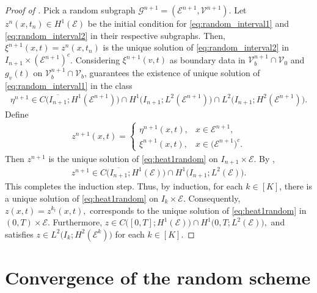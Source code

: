 \documentclass[a4paper, 10pt, english]{article}
\begin{document}
\begin{proof}[Proof of ]
Pick a random subgraph $\mathcal{G}^{n+1} = (\mathcal{E}^{n+1}, \mathcal{V}^{n+1})$. Let $z^n(x,t_n) \in H^1(\mathcal{E})$ be the initial condition for \eqref{eq:random_interval1} and \eqref{eq:random_interval2} in their respective subgraphs. Then, $ \xi^{n+1}(x,t) = z^n(x,t_n)$ is the unique solution of \eqref{eq:random_interval2} in $I_{n+1} \times (\mathcal{E}^{n+1})^c$. Considering $\xi^{n+1}(v,t)$ as boundary data in $ \mathcal{V}_b^{n+1} \cap \mathcal{V}_0$ and $g_v(t)$ on $\mathcal{V}_b^{n+1} \cap \mathcal{V}_b$,  guarantees the existence of unique solution of \eqref{eq:random_interval1} in the class
\begin{align*}
  \eta^{n+1} 
  \in 
  C\bigl(\overline{I_{n+1}}; H^1(\mathcal{E}^{n+1})\bigr)
  \cap
  H^1\bigl(I_{n+1}; L^2(\mathcal{E}^{n+1})\bigr)
  \cap
  L^2\bigl(I_{n+1}; H^2(\mathcal{E}^{n+1})\bigr).
\end{align*}
Define
\begin{align*}
  z^{n+1}(x,t)
  =
  \begin{cases}
    \eta^{n+1}(x,t), & x \in \mathcal{E}^{n+1}, \\
    \xi^{n+1}(x,t),    & x \in \bigl(\mathcal{E}^{n+1}\bigr)^c.
  \end{cases}
\end{align*}
Then $z^{n+1}$ is the unique solution of \eqref{eq:heat1random} on $I_{n+1} \times \mathcal{E}$. By ,
\begin{align*}
  z^{n+1} 
  \in 
  C\bigl(\overline{I_{n+1}}; H^1(\mathcal{E})\bigr)
  \cap
  H^1\bigl(I_{n+1}; L^2(\mathcal{E})\bigr).
\end{align*}
This completes the induction step. Thus, by induction, for each $k \in [K]$, there is a unique solution of \eqref{eq:heat1random} on $I_k \times \mathcal{E}$. Consequently, $ z(x,t) = z^{k_t}(x,t),$ corresponds to the unique solution of \eqref{eq:heat1random} in $(0,T) \times \mathcal{E}$. Furthermore, $z 
  \in
  C\bigl([0,T]; H^1(\mathcal{E})\bigr)
  \cap
  H^1\bigl(0,T; L^2(\mathcal{E})\bigr),$
and satisfies $z \in L^2\bigl(I_k; H^2(\mathcal{E}^k)\bigr)$ for each $k \in [K]$.  
\end{proof}







\section{Convergence of the random scheme}\label{sec:convergence}
\end{document}
